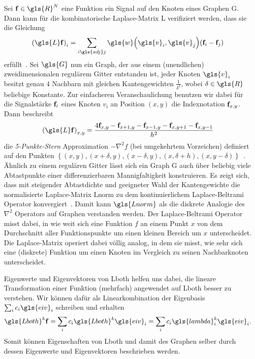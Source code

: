 Sei $\ve{f} \in \gls{R}^N$ eine Funktion \bzw{} ein Signal auf den Knoten eines Graphen \gls{G}.
Dann kann für die kombinatorische Laplace-Matrix \gls{L} verifiziert werden, dass sie die Gleichung
\begin{equation*}
  {\left(\gls{L}\ve{f}\right)}_i = \sum_{i \gls{adj} j} \gls{w}\left(\gls{v}_i, \gls{v}_j\right) \left(\ve{f}_i - \ve{f}_j\right)
\end{equation*}
erfüllt~\cite{Hammond}.
Sei $\gls{G}$ nun ein Graph, der aus einem (unendlichen) zweidimensionalen regulärem Gitter entstanden ist, \dhe{} jeder Knoten $\gls{v}_i$ besitzt genau $4$ Nachbarn mit gleichen Kantengewichten $\frac{1}{\delta^2}$, wobei $\delta \in \gls{R}$ beliebige Konstante.
Zur einfacheren Veranschaulichung benutzen wir dabei für die Signalstärke $\mathbf{f}_i$ eines Knoten $v_i$ an Position $\left(x, y\right)$ die Indexnotation $\mathbf{f}_{x,y}$.
Dann beschreibt
\begin{equation*}
  {\left(\gls{L}\ve{f}\right)}_{x,y} = \frac{4\ve{f}_{x,y} - \ve{f}_{x+1,y} - \ve{f}_{x-1,y} - \ve{f}_{x,y+1} - \ve{f}_{x,y-1}}{h^2}
\end{equation*}
die \emph{5-Punkte-Stern} Approximation $-\nabla^2 f$ (bei umgekehrtem Vorzeichen) definiert auf den Punkten $\left\{\left(x,y\right), \left(x+\delta,y\right), \left(x-\delta,y\right), \left(x,\delta+h\right),\left(x,y-\delta\right)\right\}$~\cite{Hammond}.
Ähnlich zu einem regulären Gitter lässt sich ein Graph \gls{G} auch über beliebig viele Abtastpunkte einer differenzierbaren Mannigfaltigkeit konstruieren.
Es zeigt sich, dass mit steigender Abtastdichte und geeigneter Wahl der Kantengewichte die normalisierte Laplace-Matrix \gls{Lnorm} zu dem kontinuierlichem Laplace-Beltrami Operator konvergiert~\cite{Hammond}.
Damit kann $\gls{Lnorm}$ als die diskrete Analogie des $\nabla^2$ Operators auf Graphen verstanden werden.
Der Laplace-Beltrami Operator misst dabei, in wie weit sich eine Funktion $f$ an einem Punkt $x$ von dem Durchschnitt aller Funktionspunkte um einen kleinen Bereich um $x$ unterscheidet.
Die Laplace-Matrix operiert dabei völlig analog, in dem sie misst, wie sehr sich eine (diskrete) Funktion um einen Knoten im Vergleich zu seinen Nachbarknoten unterscheidet.

Eigenwerte und Eigenvektoren von \gls{Lboth} helfen uns dabei, die lineare Transformation einer Funktion  (mehrfach) angewendet auf \gls{Lboth} besser zu verstehen.
Wir können dafür  als Linearkombination der Eigenbasis $\sum_i c_i \gls{eiv}_i$ schreiben und erhalten
\begin{equation*}
  \gls{Lboth}^k \ve{f} = \sum_i c_i \gls{Lboth}^k \gls{eiv}_i = \sum_i c_i \gls{lambda}_i^k \gls{eiv}_i.
\end{equation*}
Somit können Eigenschaften von \gls{Lboth} und damit des Graphen selber durch dessen Eigenwerte und Eigenvektoren beschrieben werden.

